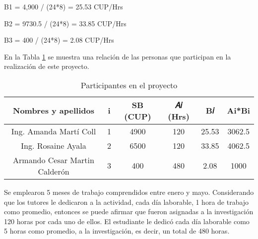 B1 = 4,900 / (24*8) = 25.53 CUP/Hrs

B2 = 9730.5 / (24*8) = 33.85 CUP/Hrs

B3 = 400 / (24*8) = 2.08 CUP/Hrs

En la Tabla \ref{table:participantes_proyecto} se muestra una relación de las personas que participan en la realización de este proyecto.
\begin{table}[H]
    \caption{Participantes en el proyecto}
    \label{table:participantes_proyecto}

    \begin{tabular}{|c|c|c|c|c|c|}
        \hline
        \textbf{Nombres y apellidos}  & \textbf{i} & \textbf{SB (CUP)} & \textbf{𝐴𝑖 (Hrs)} & \textbf{B𝑖 } & \textbf{Ai*Bi} \\
        \hline
        Ing. Amanda Martí Coll        & 1          & 4900              & 120               & 25.53        & 3062.5
        \\
        \hline
        Ing. Rosaine Ayala            & 2          & 6500              & 120               & 33.85        & 4062.5
        \\
        \hline
        Armando Cesar Martin Calderón & 3          & 400               & 480               & 2.08         & 1000
        \\

        \hline
    \end{tabular}
\end{table}
Se emplearon 5 meses de trabajo comprendidos entre enero y mayo. Considerando que los tutores le dedicaron a la actividad, cada día laborable, 1 hora de trabajo como promedio, entonces se puede afirmar que fueron asignadas a la investigación 120 horas por cada uno de ellos.
El estudiante le dedicó cada día laborable como 5 horas como promedio, a la investigación, es decir, un total de 480 horas.

